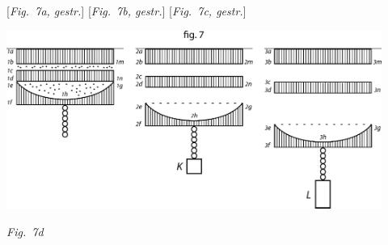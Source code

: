 \\
\\
\vspace{1em}
\hspace*{12mm} [\textit{Fig.~7a, gestr.}]\hspace*{21mm} [\textit{Fig.~7b, gestr.}]\hspace*{16mm} [\textit{Fig.~7c, gestr.}]
\vspace{1.5em}
\pend

%
  \vspace{3em}%
  \centerline{\includegraphics[width=0.92\textwidth]{gesamttex/edit_VIII,3/images/LH_35_09_16_002-003_d7d.pdf}}%
  \vspace{0.5em}
  \centerline{\lbrack\textit{Fig.~7d}\rbrack}%
  \label{LH_35_09_16_003r_Fig.7}%
  \count{}
\count{}
\count{}
%
%
